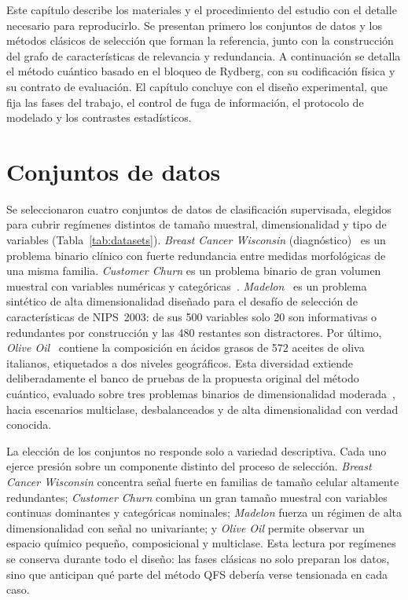 \label{cap:metodos}

Este capítulo describe los materiales y el procedimiento del estudio
con el detalle necesario para reproducirlo. Se presentan primero los
conjuntos de datos y los métodos clásicos de selección que forman la
referencia, junto con la construcción del grafo de características de
relevancia y redundancia. A continuación se detalla el método cuántico
basado en el bloqueo de Rydberg, con su codificación física y su
contrato de evaluación. El capítulo concluye con el diseño
experimental, que fija las fases del trabajo, el control de fuga de
información, el protocolo de modelado y los contrastes estadísticos.

\section{Conjuntos de datos}
\label{sec:datos}

Se seleccionaron cuatro conjuntos de datos de clasificación
supervisada, elegidos para cubrir regímenes distintos de tamaño
muestral, dimensionalidad y tipo de variables
(Tabla~\ref{tab:datasets}). \textit{Breast Cancer Wisconsin}
(diagnóstico)~\cite{street1993} es un problema binario clínico con
fuerte redundancia entre medidas morfológicas de una misma familia.
\textit{Customer Churn} es un problema binario de gran volumen
muestral con variables numéricas y categóricas~\cite{churn_kaggle}.
\textit{Madelon}~\cite{guyon2004} es un problema sintético de alta
dimensionalidad diseñado para el desafío de selección de
características de NIPS~2003: de sus 500 variables solo 20 son
informativas o redundantes por construcción y las 480 restantes son
distractores. Por último, \textit{Olive Oil}~\cite{forina1983}
contiene la composición en ácidos grasos de 572 aceites de oliva
italianos, etiquetados a dos niveles geográficos. Esta diversidad
extiende deliberadamente el banco de pruebas de la propuesta original
del método cuántico, evaluado sobre tres problemas binarios de
dimensionalidad moderada~\cite{orquin2026}, hacia escenarios
multiclase, desbalanceados y de alta dimensionalidad con verdad
conocida.

La elección de los conjuntos no responde solo a variedad descriptiva.
Cada uno ejerce presión sobre un componente distinto del proceso de
selección. \textit{Breast Cancer Wisconsin} concentra señal fuerte en
familias de tamaño celular altamente redundantes; \textit{Customer
Churn} combina un gran tamaño muestral con variables continuas
dominantes y categóricas nominales; \textit{Madelon} fuerza un régimen
de alta dimensionalidad con señal no univariante; y \textit{Olive Oil}
permite observar un espacio químico pequeño, composicional y multiclase.
Esta lectura por regímenes se conserva durante todo el diseño: las
fases clásicas no solo preparan los datos, sino que anticipan qué parte
del método QFS debería verse tensionada en cada caso.

